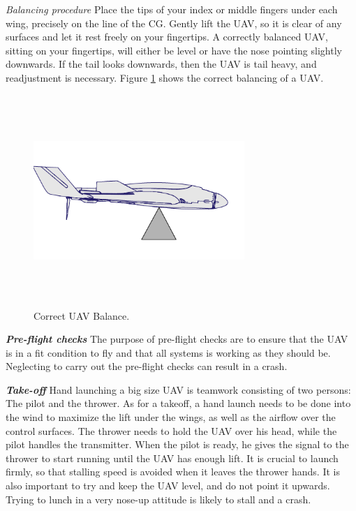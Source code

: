 \textit{Balancing procedure} Place the tips of your index or middle fingers under each wing, precisely on the line of the CG. Gently lift the UAV, so it is clear of any surfaces and let it rest freely on your fingertips.
A correctly balanced UAV, sitting on your fingertips, will either be level or have the nose pointing slightly downwards. If the tail looks downwards, then the UAV is tail heavy, and readjustment is necessary. Figure \ref{fig:Balance} shows the correct balancing of a UAV.

\begin{figure}[H]
\centering
\includegraphics[width=8cm,height=8cm,keepaspectratio]{imagenes/Balance.png}
\caption{Correct UAV Balance.}
\label{fig:Balance}
\end{figure}
\textit{\textbf{Pre-flight checks}} \newline
The purpose of pre-flight checks are to ensure that the UAV is in a fit condition to fly and that all systems is working as they should be.  Neglecting to carry out the pre-flight checks can result in a crash.

\textit{\textbf{Take-off}} \newline
Hand launching a big size UAV is teamwork consisting of two persons: The pilot and the thrower. As for a takeoff, a hand launch needs to be done into the wind to maximize the lift under the wings, as well as the airflow over the control surfaces.
The thrower needs to hold the UAV over his head, while the pilot handles the transmitter. When the pilot is ready, he gives the signal to the thrower to start running until the UAV has enough lift. It is crucial to launch firmly, so that stalling speed is avoided when it leaves the thrower hands. 
It is also important to try and keep the UAV level, and do not point it upwards. Trying to lunch in a very nose-up attitude is likely to stall and a crash.

